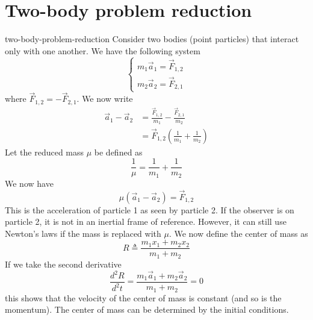 \documentclass[preview]{standalone}
\begin{document}
\genpage

\section{Two-body problem reduction}

\begin{snippet}{two-body-problem-reduction}
    Consider two bodies (point particles) that interact only with one another.
    We have the following system
    \[
    \begin{cases}
        m_1\vec{a}_1 = \vec{F}_{1,2} \\
        m_2\vec{a}_2 = \vec{F}_{2,1}
    \end{cases}
    \]
    where \(\vec{F}_{1,2} = - \vec{F}_{2,1}\).
    We now write
    \begin{align*}
        \vec{a}_1 - \vec{a}_2 &= \frac{\vec{F}_{1,2}}{m_1} - \frac{\vec{F}_{2,1}}{m_2} \\
        &= \vec{F}_{1,2} \left(\frac{1}{m_1} + \frac{1}{m_2}\right)
    \end{align*}
    Let the reduced mass \(\mu\) be defined as
    \[
        \frac{1}{\mu} = \frac{1}{m_1} + \frac{1}{m_2}
    \]
    We now have
    \[
        \mu(\vec{a}_1 - \vec{a}_2) = \vec{F}_{1,2}
    \]
    This is the acceleration of particle 1 as seen by particle 2.
    If the observer is on particle 2, it is not in an inertial frame of reference.
    However, it can still use Newton's laws if the mass is replaced with \(\mu\).
    We now define the center of mass as
    \[
        R \triangleq \frac{m_1x_1 + m_2x_2}{m_1 + m_2}
    \]
    If we take the second derivative
    \[
        \frac{d^2R}{d^2t} = \frac{m_1\vec{a}_1 + m_2\vec{a}_2}{m_1 + m_2} = 0
    \]
    this shows that the velocity of the center of mass is constant (and so is the momentum).
    The center of mass can be determined by the initial conditions.
\end{snippet}
\end{document}
